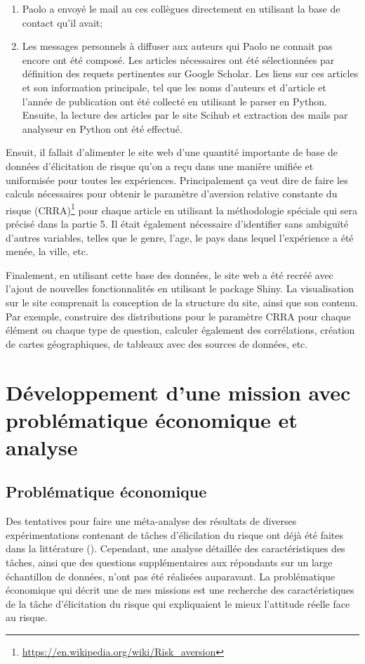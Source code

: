 \documentclass[12pt]{article}
\begin{document}
\begin{enumerate}
\item Paolo a envoyé le mail au ces collègues directement en utilisant la base de contact qu'il avait;
\item Les messages personnels à diffuser aux auteurs qui Paolo ne connait pas encore ont été composé. Les articles nécessaires ont été sélectionnées par définition des requets pertinentes sur Google Scholar. Les liens sur ces articles et son information principale, tel que les noms d'auteurs et d'article et l'année de publication ont été collecté en utilisant le parser en Python. Ensuite, la lecture des articles par le site Scihub et extraction des mails par analyseur en Python ont été effectué. 
\end{enumerate}

Ensuit, il fallait d'alimenter le site web d'une quantité importante de
base de données d'élicitation de risque qu'on a reçu dans une manière
unifiée et uniformisée pour toutes les expériences. Principalement ça
veut dire de faire les calculs nécessaires pour obtenir le paramètre
d'aversion relative constante du risque (CRRA)\footnote{\url{https://en.wikipedia.org/wiki/Risk_aversion}}
pour chaque article en utilisant la méthodologie spéciale qui sera
précisé dans la partie 5. Il était également nécessaire d'identifier
sans ambiguïté d'autres variables, telles que le genre, l'age, le pays
dans lequel l'expérience a été menée, la ville, etc.

Finalement, en utilisant cette base des données, le site web a été
recréé avec l'ajout de nouvelles fonctionnalités en utilisant le package
Shiny. La visualisation sur le site comprenait la conception de la
structure du site, ainsi que son contenu. Par exemple, construire des
distributions pour le paramètre CRRA pour chaque élément ou chaque type
de question, calculer également des corrélations, création de cartes
géographiques, de tableaux avec des sources de données, etc.

\section{Développement d’une mission avec problématique économique et analyse}
\label{sec:fourth}

\subsection{Problématique économique}

Des tentatives pour faire une méta-analyse des résultats de diverses
expérimentations contenant de tâches d'élicilation du risque ont déjà
été faites dans la littérature (\citet{CroFil2013b}). Cependant, une
analyse détaillée des caractéristiques des tâches, ainsi que des
questions supplémentaires aux répondants sur un large échantillon de
données, n'ont pas été réalisées auparavant. La problématique économique
qui décrit une de mes missions est une recherche des caractéristiques de
la tâche d'élicitation du risque qui expliquaient le mieux l'attitude
réelle face au risque.
\end{document}
